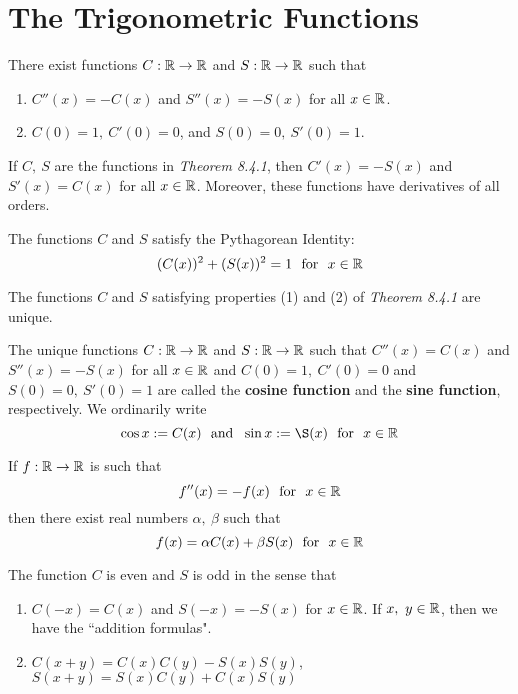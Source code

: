 \section{The Trigonometric Functions}

\begin{theorem}
	There exist functions $C:\mathbb{R} \to \mathbb{R}$ and $S:\mathbb{R}\to\mathbb{R}$ such that
	\begin{enumerate}
		\item $C''(x)=-C(x)$ and $S''(x)=-S(x)$ for all $x \in \mathbb{R}$.
		\item $C(0)=1,\ C'(0)=0$, and $S(0)=0,\ S'(0)=1$.
	\end{enumerate}
\end{theorem}

\begin{corollary}
	If $C,\ S$ are the functions in \textit{Theorem 8.4.1}, then $C'(x)=-S(x)$ and $S'(x)=C(x)$ for all $x \in \mathbb{R}$. Moreover, these functions have derivatives of all orders.
\end{corollary}

\begin{corollary}
	The functions $C$ and $S$ satisfy the Pythagorean Identity:
	\[(C(x))^2+(S(x))^2=1\ \ \text{for}\ \ x \in \mathbb{R}\]
\end{corollary}

\begin{theorem}
	The functions $C$ and $S$ satisfying properties (1) and (2) of \textit{Theorem 8.4.1} are unique.
\end{theorem}

\begin{definition}
	The unique functions $C:\mathbb{R}\to\mathbb{R}$ and $S:\mathbb{R}\to\mathbb{R}$ such that $C''(x)=C(x)$ and $S''(x)=-S(x)$ for all $x \in \mathbb{R}$ and $C(0)=1,\ C'(0)=0$ and $S(0)=0,\ S'(0)=1$ are called the \textbf{cosine function} and the \textbf{sine function}, respectively. We ordinarily write
	\[\cos x := C(x)\ \ \text{and}\ \ \sin x := \S(x)\ \ \text{for}\ \ x \in \R\]
\end{definition}

\begin{theorem}
	If $f:\mathbb{R}\to\mathbb{R}$ is such that
	\[f''(x)=-f(x)\ \ \text{for}\ \ x \in \mathbb{R}\]
	then there exist real numbers $\alpha,\ \beta$ such that
	\[f(x)=\alpha C(x)+\beta S(x)\ \ \text{for}\ \ x \in \R\]
\end{theorem}

\begin{theorem}
	The function $C$ is even and $S$ is odd in the sense that
	\begin{enumerate}
		\item $C(-x)=C(x)$ and $S(-x)=-S(x)$ for $x \in \mathbb{R}$. If $x,\ y \in \mathbb{R}$, then we have the ``addition formulas".
		\item $C(x+y)=C(x)C(y)-S(x)S(y)$, $S(x+y)=S(x)C(y)+C(x)S(y)$
	\end{enumerate}
\end{theorem}

